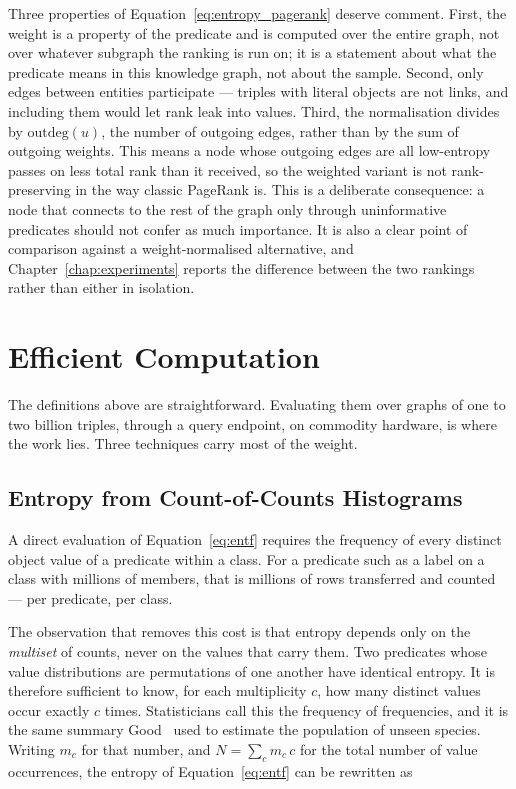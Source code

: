 Three properties of Equation~\ref{eq:entropy_pagerank} deserve comment. First,
the weight is a property of the predicate and is computed over the entire graph,
not over whatever subgraph the ranking is run on; it is a statement about what
the predicate means in this knowledge graph, not about the sample. Second, only
edges between entities participate --- triples with literal objects are not
links, and including them would let rank leak into values. Third, the
normalisation divides by $\mathrm{outdeg}(u)$, the number of outgoing edges,
rather than by the sum of outgoing weights. This means a node whose outgoing
edges are all low-entropy passes on less total rank than it received, so the
weighted variant is not rank-preserving in the way classic PageRank is. This is a
deliberate consequence: a node that connects to the rest of the graph only
through uninformative predicates should not confer as much importance. It is also
a clear point of comparison against a weight-normalised alternative, and
Chapter~\ref{chap:experiments} reports the difference between the two rankings
rather than either in isolation.

\section{Efficient Computation}
\label{sec:efficient_computation}

The definitions above are straightforward. Evaluating them over graphs of one to
two billion triples, through a query endpoint, on commodity hardware, is where
the work lies. Three techniques carry most of the weight.

\subsection{Entropy from Count-of-Counts Histograms}
\label{subsec:count_of_counts}

A direct evaluation of Equation~\ref{eq:entf} requires the frequency of every
distinct object value of a predicate within a class. For a predicate such as a
label on a class with millions of members, that is millions of rows transferred
and counted --- per predicate, per class.

The observation that removes this cost is that entropy depends only on the
\emph{multiset} of counts, never on the values that carry them. Two predicates
whose value distributions are permutations of one another have identical entropy.
It is therefore sufficient to know, for each multiplicity $c$, how many distinct
values occur exactly $c$ times. Statisticians call this the frequency of
frequencies, and it is the same summary Good~\cite{good1953population} used to
estimate the population of unseen species. Writing $m_c$ for that number, and
$N = \sum_c m_c \, c$ for the total number of value occurrences, the entropy of
Equation~\ref{eq:entf} can be rewritten as

